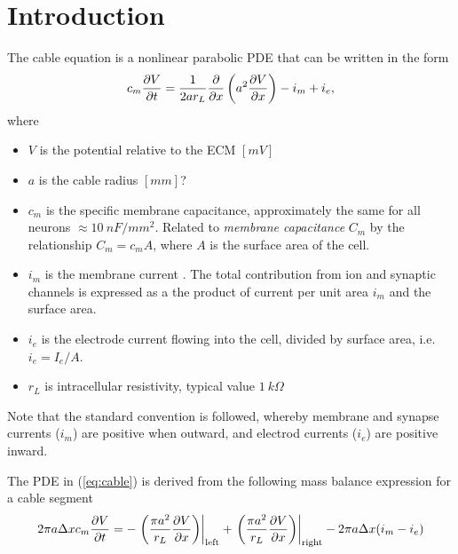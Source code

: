 \section*{Introduction}

The cable equation is a nonlinear parabolic PDE that can be written in the form
\begin{equation}
    \label{eq:cable}
    c_m \frac{\partial{V}}{\partial{t}} = \frac{1}{2ar_{L}} \frac{\partial{}}{\partial{x}} \left( a^2 \frac{\partial{V}}{\partial{x}} \right) - i_m + i_e,
\end{equation}
where
\begin{itemize}
    \item $V$ is the potential relative to the ECM $[mV]$
    \item $a$ is the cable radius  $[mm]$?
    \item $c_m$ is the {specific membrane capacitance}, approximately the same for all neurons $\approx 10~nF/mm^2$. Related to \emph{membrane capacitance} $C_m$ by the relationship $C_m=c_{m}A$, where $A$ is the surface area of the cell.
    \item $i_m$ is the membrane current . The total contribution from ion and synaptic channels is expressed as a the product of current per unit area $i_m$ and the surface area.
    \item $i_e$ is the electrode current flowing into the cell, divided by surface area, i.e. $i_e=I_e/A$.
    \item $r_L$ is intracellular resistivity, typical value $1~k\Omega$
\end{itemize}

Note that the standard convention is followed, whereby membrane and synapse currents ($i_m$) are positive when outward, and electrod currents ($i_e$) are positive inward.

The PDE in (\ref{eq:cable}) is derived from the following mass balance expression for a cable segment
\begin{equation}
    \label{eq:cable}
    2\pi a \Delta x c_m \frac{\partial{V}}{\partial{t}} = -\left. \left( \frac{\pi a^2}{r_L}\frac{\partial{V}}{\partial{x}} \right) \right|_\text{left}
                                      +\left. \left( \frac{\pi a^2}{r_L}\frac{\partial{V}}{\partial{x}} \right) \right|_\text{right}
                                      - 2\pi a \Delta x (i_m - i_e)
\end{equation}

